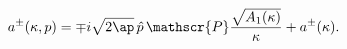 \begin{equation}
a^{\pm}(\kappa,p)=\mp i\sqrt{2\ap}\, \hat{p}\,\mathscr{P}\frac{\sqrt{A_1(\kappa)}}{\kappa}
+a^{\pm}(\kappa).
\label{519}
\end{equation}

